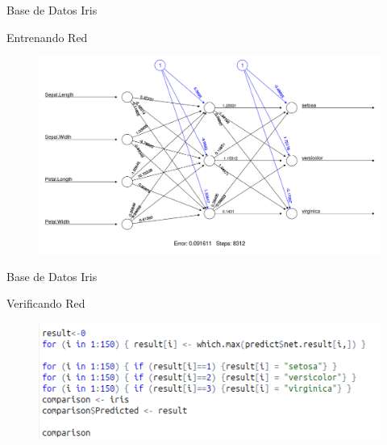 \documentclass{beamer}
\begin{document}
\begin{frame}{Base de Datos Iris}
\begin{block}{Entrenando Red}
\begin{figure}
\includegraphics[scale=0.25]{entrenadairis.png}
\centering
\end{figure}
\end{block}
\end{frame}

\begin{frame}{Base de Datos Iris}
\begin{block}{Verificando Red}
\begin{figure}
\includegraphics[scale=0.4]{comparando.png}
\centering
\end{figure}
\end{block}
\end{frame}
\end{document}
